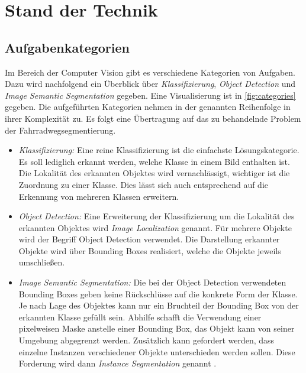 
\chapter{Stand der Technik}

\section{Aufgabenkategorien}

Im Bereich der Computer Vision gibt es verschiedene Kategorien von Aufgaben.
Dazu wird nachfolgend ein Überblick über \textit{Klassifizierung}, \textit{Object Detection} und \textit{Image Semantic Segmentation} gegeben.
Eine Visualisierung ist in \autoref{fig:categories} gegeben.
Die aufgeführten Kategorien nehmen in der genannten Reihenfolge in ihrer Komplexität zu.
Es folgt eine Übertragung auf das zu behandelnde Problem der Fahrradwegsegmentierung.

\begin{itemize}
	\item \textit{Klassifizierung:}
	Eine reine Klassifizierung ist die einfachste Lösungskategorie. 
	Es soll lediglich erkannt werden, welche Klasse in einem Bild enthalten ist.
	Die Lokalität des erkannten Objektes wird vernachlässigt, wichtiger ist die Zuordnung zu einer Klasse.
	Dies lässt sich auch entsprechend auf die Erkennung von mehreren Klassen erweitern.
	
	\item \textit{Object Detection:}
	Eine Erweiterung der Klassifizierung um die Lokalität des erkannten Objektes wird \textit{Image Localization} genannt.
	Für mehrere Objekte wird der Begriff Object Detection verwendet.
	Die Darstellung erkannter Objekte wird über Bounding Boxes realisiert, welche die Objekte jeweils umschließen.

	\item \textit{Image Semantic Segmentation:}
	Die bei der Object Detection verwendeten Bounding Boxes geben keine Rückschlüsse auf die konkrete Form der Klasse.
	Je nach Lage des Objektes kann nur ein Bruchteil der Bounding Box von der erkannten Klasse gefüllt sein.
	Abhilfe schafft die Verwendung einer pixelweisen Maske anstelle einer Bounding Box, das Objekt kann von seiner Umgebung abgegrenzt werden.
	Zusätzlich kann gefordert werden, dass einzelne Instanzen verschiedener Objekte unterschieden werden sollen.
	Diese Forderung wird dann \textit{Instance Segmentation} genannt \cite{Sharma.21.08.2019}.
\end{itemize}

